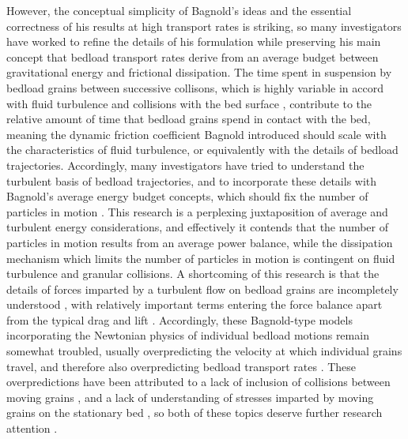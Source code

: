 \documentclass{article}
\begin{document}
However, the conceptual simplicity of Bagnold's ideas and the essential correctness of his results at high transport rates is striking, so many investigators have worked to refine the details of his formulation while preserving his main concept that bedload transport rates derive from an average budget between gravitational energy and frictional dissipation. 
The time spent in suspension by bedload grains between successive collisons, which is highly variable in accord with fluid turbulence and collisions with the bed surface \citep{Bialik2015}, contribute to the relative amount of time that bedload grains spend in contact with the bed, meaning the dynamic friction coefficient Bagnold introduced should scale with the characteristics of fluid turbulence, or equivalently with the details of bedload trajectories. 
Accordingly, many investigators have tried to understand the turbulent basis of bedload trajectories, and to incorporate these details with Bagnold's average energy budget concepts, which should fix the number of particles in motion \citep{Abbott1977, Bridge1984, Wiberg1989, Bridge1992, Nino1998}.
This research is a perplexing juxtaposition of average and turbulent energy considerations, and effectively it contends that the number of particles in motion results from an average power balance, while the dissipation mechanism which limits the number of particles in motion is contingent on fluid turbulence and granular collisions. 
A shortcoming of this research is that the details of forces imparted by a turbulent flow on bedload grains are incompletely understood \citep{Maxey1986, Schmeeckle2007, Dwivedi2010, Dwivedi2011}, with relatively important terms entering the force balance apart from the typical drag and lift \citep{Bialik2015}.
Accordingly, these Bagnold-type models incorporating the Newtonian physics of individual bedload motions remain somewhat troubled, usually overpredicting the velocity at which individual grains travel, and therefore also overpredicting bedload transport rates \citep{Bridge1984, Bialik2015}. 
These overpredictions have been attributed to a lack of inclusion of collisions between moving grains \citep{Lee2002}, and a lack of understanding of stresses imparted by moving grains on the stationary bed \citep{Nino1998}, so both of these topics deserve further research attention \citep{Bialik2015}.  
\end{document}
